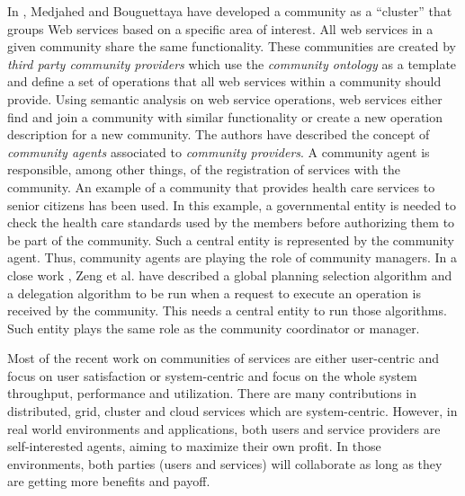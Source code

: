 \documentclass[10pt,journal,cspaper,compsoc]{IEEEtran}
\begin{document}
In \cite{Medjahed05adynamic}, Medjahed and Bouguettaya have
developed a community as a ``cluster'' that groups Web services
based on a specific area of interest. All web services in a given
community share the same functionality. These communities are
created by \emph{third party community providers} which use the
\emph{community ontology} as a template and define a set of
operations that all web services within a community should
provide. Using semantic analysis on web service operations, web
services either find and join a community with similar
functionality or create a new operation description for a new
community. The authors have described the concept of
\emph{community agents} associated to \emph{community providers}.
A community agent is responsible, among other things, of the
registration of services with the community. An example of a
community that provides health care services to senior citizens
has been used. In this example, a governmental entity is needed to
check the health care standards used by the members before
authorizing them to be part of the community. Such a central
entity is represented by the community agent. Thus, community
agents are playing the role of community managers. In a close work
\cite{Zeng:2003:QDW:775152.775211}, Zeng et al. have described a
global planning selection algorithm and a delegation algorithm to
be run when a request to execute an operation is received by the
community. This needs a central entity to run those algorithms.
Such entity plays the same role as the community coordinator or
manager.

Most of the recent work on communities of services are either
user-centric and focus on user satisfaction
\cite{Chun02user-centricperformance} or system-centric and focus
on the whole system throughput, performance and utilization. There
are many contributions in distributed, grid, cluster and cloud
services which are system-centric. However, in real world
environments and applications, both users and service providers
are self-interested agents, aiming to maximize their own profit.
In those environments, both parties (users and services) will
collaborate as long as they are getting more benefits and payoff.
\end{document}

